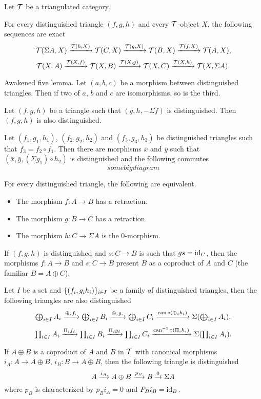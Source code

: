 \begin{proposition}
Let $\mathcal{T}$ be a triangulated category.
\begin{rmnumerate}
    \item For every distinguished triangle $(f,g,h)$ and every $\mathcal{T}$-object $X$, the following sequences are exact
    \[\mathcal{T}(\Sigma A,X)\xrightarrow{\mathcal{T}(h,X)}\mathcal{T}(C,X)\xrightarrow{\mathcal{T}(g,X)}\mathcal{T}(B,X)\xrightarrow{\mathcal{T}(f,X)}\mathcal{T}(A,X),\]
    \[\mathcal{T}(X,A)\xrightarrow{\mathcal{T}(X,f)}\mathcal{T}(X,B)\xrightarrow{\mathcal{T}(X,g)}\mathcal{T}(X,C)\xrightarrow{\mathcal{T}(X,h)}\mathcal{T}(X,\Sigma A).\]
    
    \item Awakened five lemma. Let $(a,b,c)$ be a morphism between distinguished triangles. Then if two of $a$, $b$ and $c$ are isomorphisms, so is the third.
    
    \item Let $(f,g,h)$ be a triangle such that $(g,h,-\Sigma f)$ is distinguished. Then $(f,g,h)$ is also distinguished.
    
    \item Let $(f_1,g_1,h_1)$, $(f_2,g_2,h_2)$ and $(f_3,g_3,h_3)$ be distinguished triangles such that $f_3=f_2\circ f_1$. Then there are morphisms $\bar x$ and $\bar y$ such that $(\bar x,\bar y,(\Sigma g_1)\circ h_2)$ is distinguished and the following commutes
    \[
    somebigdiagram
    \]
    
    \item For every distinguished triangle, the following are equivalent.
    \begin{itemize}
        \item The morphism $f:A\to B$ has a retraction.
        \item The morphism $g:B\to C$ has a retraction.
        \item The morphism $h:C\to\Sigma A$ is the $0$-morphism.
    \end{itemize}
    
    \item If $(f,g,h)$ is distinguished and $s:C\to B$ is such that $gs=\operatorname{id}_C$, then the morphisms $f:A\to B$ and $s:C\to B$ present $B$ as a coproduct of $A$ and $C$ (the familiar $B=A\oplus C$).
    
    \item Let $I$ be a set and $\{(f_i,g_ih_i)\}_{i\in I}$ be a family of distinguished triangles, then the following triangles are also distinguished
    \[\textstyle\bigoplus_{i\in I}A_i\xrightarrow{\oplus_i f_i}\textstyle\bigoplus_{i\in I}B_i\xrightarrow{\oplus_i g_i}\textstyle\bigoplus_{i\in I}C_i\xrightarrow{\operatorname{can}\circ(\oplus_i h_i)}\Sigma(\textstyle\bigoplus_{i\in I} A_i),\]
    \[\textstyle\prod_{i\in I}A_i\xrightarrow{\Pi_i f_i}\textstyle\prod_{i\in I}B_i\xrightarrow{\Pi_i g_i}\textstyle\prod_{i\in I}C_i\xrightarrow{\operatorname{can}^{-1}\circ(\Pi_i h_i)}\Sigma(\textstyle\prod_{i\in I} A_i).\]
    
    \item If $A\oplus B$ is a coproduct of $A$ and $B$ in $\mathcal{T}$ with canonical morphisms $i_A:A\to A\oplus B$, $i_B:B\to A\oplus B$, then the following triangle is distinguished
    \[A\xrightarrow{i_A}A\oplus B\xrightarrow{p_B}B\xrightarrow{0}\Sigma A\]
    where $p_B$ is characterized by $p_Bi_A=0$ and $P_Bi_B=\operatorname{id}_B$.
\end{rmnumerate}
\end{proposition}

